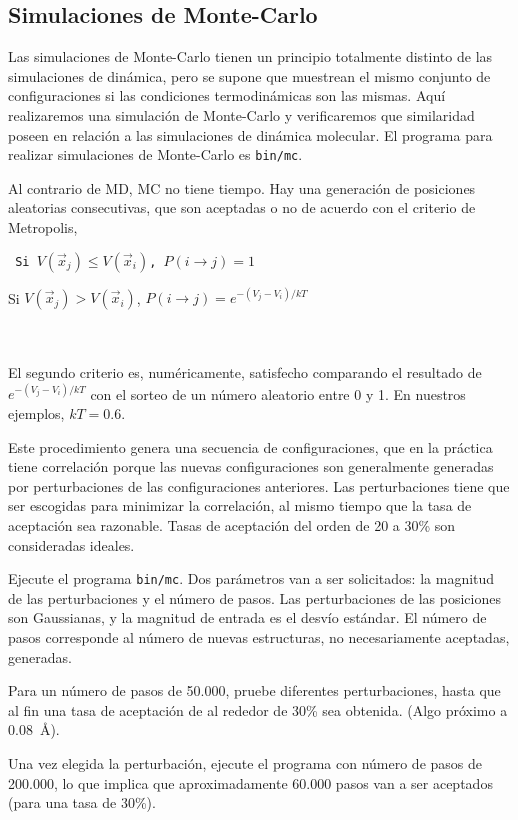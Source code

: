 \subsection{Simulaciones de Monte-Carlo}

Las simulaciones de Monte-Carlo tienen un principio totalmente distinto
de las simulaciones de dinámica, pero se supone que muestrean el mismo
conjunto de configuraciones si las condiciones termodinámicas son las
mismas. Aquí realizaremos una simulación de Monte-Carlo y verificaremos
que similaridad poseen en relación a las simulaciones de dinámica
molecular. El programa para realizar simulaciones de Monte-Carlo es 
{\tt bin/mc}.

Al contrario de MD, MC no tiene tiempo. Hay una generación de posiciones
aleatorias consecutivas, que son aceptadas o no de acuerdo con el
criterio de Metropolis,\\

{\tt 
\hspace{3cm} Si $V(\vec{x}_j) \leqslant V(\vec{x}_i)$, $P(i\to j) = 1$ 

\hspace{3cm} Si $V(\vec{x}_j) > V(\vec{x}_i)$, $P(i\to j) = e^{-(V_j-V_i)/kT}$
}\\\\
El segundo criterio es, numéricamente, satisfecho comparando el
resultado de $e^{-(V_j-V_i)/kT}$ con el sorteo de un número aleatorio
entre 0 y 1. En nuestros ejemplos, $kT=0.6$.

Este procedimiento genera una secuencia de configuraciones, que en la
práctica tiene correlación porque las nuevas configuraciones son
generalmente generadas por perturbaciones de las configuraciones
anteriores. Las perturbaciones tiene que ser escogidas para minimizar la
correlación, al mismo tiempo que la tasa de aceptación sea razonable.
Tasas de aceptación del orden de 20 a 30\% son consideradas ideales. 

Ejecute el programa {\tt bin/mc}. Dos parámetros van a ser solicitados:
la magnitud de las perturbaciones y el número de pasos. Las
perturbaciones de las posiciones son Gaussianas, y la magnitud de
entrada es el desvío estándar. El número de pasos corresponde al número
de nuevas estructuras, no necesariamente aceptadas, generadas.  

Para un número de pasos de 50.000, pruebe diferentes perturbaciones,
hasta que al fin una tasa de aceptación de al rededor de 30\% sea
obtenida. (Algo próximo a $0.08$~\AA). 

Una vez elegida la perturbación, ejecute el programa con número de pasos
de 200.000, lo que implica que aproximadamente 60.000 pasos van a ser
aceptados (para una tasa de 30\%). 

